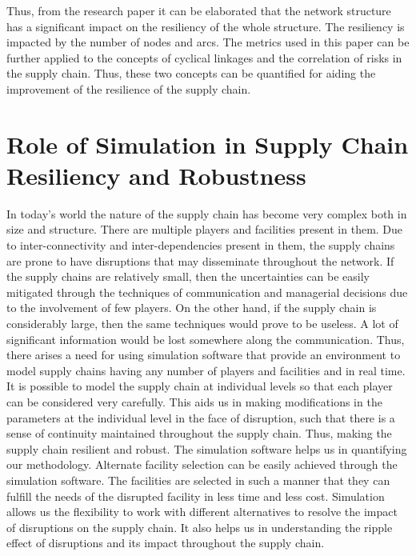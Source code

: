 Thus, from the research paper it can be elaborated that the network structure has a significant impact on the resiliency of the whole structure. The resiliency is impacted by the number of nodes and arcs. The metrics used in this paper can be further applied to the concepts of cyclical linkages and the correlation of risks in the supply chain. Thus, these two concepts can be quantified for aiding the improvement of the resilience of the supply chain.


\section{Role of Simulation in Supply Chain Resiliency and Robustness} 
    
In today's world the nature of the supply chain has become very complex both in size and structure. There are multiple players and facilities present in them. Due to inter-connectivity and inter-dependencies present in them, the supply chains are prone to have disruptions that may disseminate throughout the network. If the supply chains are relatively small, then the uncertainties can be easily mitigated through the techniques of communication and managerial decisions due to the involvement of few players. On the other hand, if the supply chain is considerably large, then the same techniques would prove to be useless. A lot of significant information would be lost somewhere along the communication. Thus, there arises a need for using simulation software that provide an environment to model supply chains having any number of players and facilities and in real time. It is possible to model the supply chain at individual levels so that each player can be considered very carefully. This aids us in making modifications in the parameters at the individual level in the face of disruption, such that there is a sense of continuity maintained throughout the supply chain. Thus, making the supply chain resilient and robust. The simulation software helps us in quantifying our methodology. Alternate facility selection can be easily achieved through the simulation software. The facilities are selected in such a manner that they can fulfill the needs of the disrupted facility in less time and less cost. Simulation allows us the flexibility to work with different alternatives to resolve the impact of disruptions on the supply chain. It also helps us in understanding the ripple effect of disruptions and its impact throughout the supply chain.



